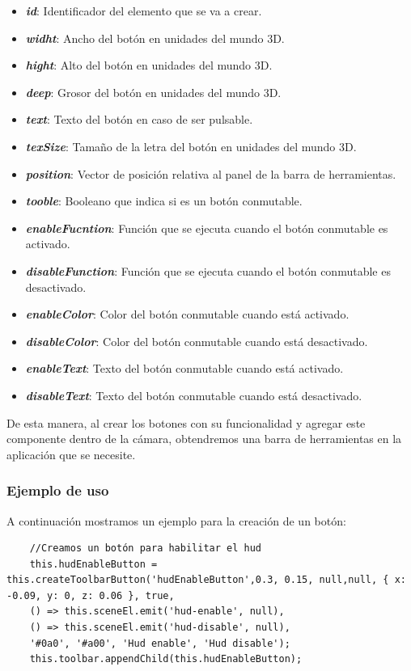 \documentclass[a4paper, 11pt]{book}
\begin{document}
\begin{itemize}
	\item \textbf{\emph{id}}: Identificador del elemento que se va a crear.
	\item \textbf{\emph{widht}}: Ancho del botón en unidades del mundo 3D.
	\item \textbf{\emph{hight}}: Alto del botón en unidades del mundo 3D.
	\item \textbf{\emph{deep}}: Grosor del botón en unidades del mundo 3D.
	\item \textbf{\emph{text}}: Texto del botón en caso de ser pulsable.
	\item \textbf{\emph{texSize}}: Tamaño de la letra del botón en unidades del mundo 3D.
	\item \textbf{\emph{position}}: Vector de posición relativa al panel de la barra de herramientas.
	\item \textbf{\emph{tooble}}: Booleano que indica si es un botón conmutable.
	\item \textbf{\emph{enableFucntion}}: Función que se ejecuta cuando el botón conmutable es activado.
	\item \textbf{\emph{disableFunction}}: Función que se ejecuta cuando el botón conmutable es desactivado.
	\item \textbf{\emph{enableColor}}: Color del botón conmutable cuando está activado.
	\item \textbf{\emph{disableColor}}: Color del botón conmutable cuando está desactivado.
	\item \textbf{\emph{enableText}}: Texto del botón conmutable cuando está activado.
	\item \textbf{\emph{disableText}}: Texto del botón conmutable cuando está desactivado.
\end{itemize}

De esta manera, al crear los botones con su funcionalidad y agregar este componente dentro de la cámara, obtendremos una barra de herramientas en la aplicación que se necesite.
\subsubsection{Ejemplo de uso}
A continuación mostramos un ejemplo para la creación de un botón:
\begin{verbatim}
	//Creamos un botón para habilitar el hud
	this.hudEnableButton = this.createToolbarButton('hudEnableButton',0.3, 0.15, null,null, { x: -0.09, y: 0, z: 0.06 }, true,
	() => this.sceneEl.emit('hud-enable', null),
	() => this.sceneEl.emit('hud-disable', null),
	'#0a0', '#a00', 'Hud enable', 'Hud disable');
	this.toolbar.appendChild(this.hudEnableButton);
\end{verbatim}
\end{document}
